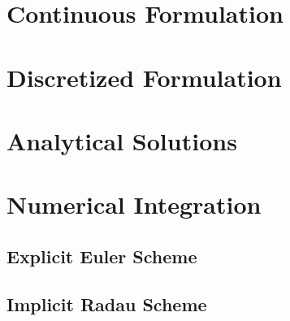 \section{Continuous Formulation}
\section{Discretized Formulation}
\section{Analytical Solutions}
\section{Numerical Integration}
    \subsection{Explicit Euler Scheme}
    \subsection{Implicit Radau Scheme}
